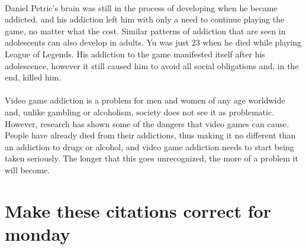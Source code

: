 \documentclass[a4paper,man,natbib]{apa6}
\begin{document}
\paragraph{}
Daniel Petric’s brain was still in the process of developing when he became addicted, and his addiction left him with only a need to continue playing the game, no matter what the cost. Similar patterns of addiction that are seen in adolescents can also develop in adults. Yu was just 23 when he died while playing League of Legends. His addiction to the game manifested itself after his adolescence, however it still caused him to avoid all social obligations and, in the end, killed him.	
\paragraph{}
Video game addiction is a problem for men and women of any age worldwide and, unlike gambling or alcoholism, society does not see it as problematic. However, research has shown some of the dangers that video games can cause. People have already died from their addictions, thus making it no different than an addiction to drugs or alcohol, and video game addiction needs to start being taken seriously. The longer that this goes unrecognized, the more of a problem it will become.

\section{Make these citations correct for monday}
\paragraph{}
%
%
%
\end{document}
